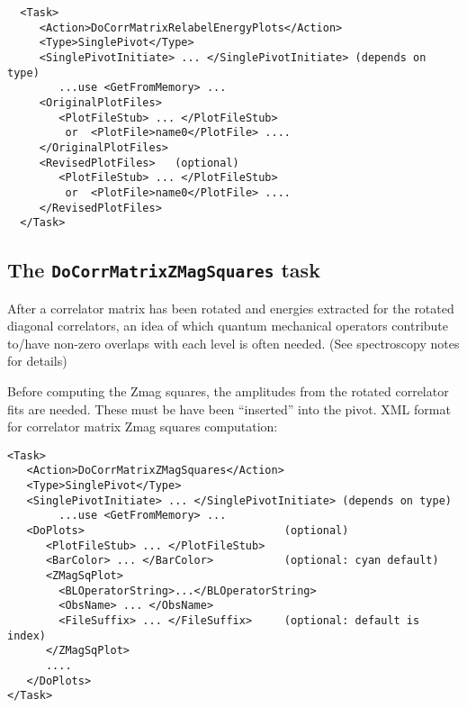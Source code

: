\documentclass[12pt]{article}
\newcommand{\vb}{\texttt}
\begin{document}
\begin{verbatim}
  <Task>
     <Action>DoCorrMatrixRelabelEnergyPlots</Action>
     <Type>SinglePivot</Type>
     <SinglePivotInitiate> ... </SinglePivotInitiate> (depends on type)
        ...use <GetFromMemory> ...
     <OriginalPlotFiles>
        <PlotFileStub> ... </PlotFileStub>
         or  <PlotFile>name0</PlotFile> ....
     </OriginalPlotFiles>
     <RevisedPlotFiles>   (optional)
        <PlotFileStub> ... </PlotFileStub>
         or  <PlotFile>name0</PlotFile> ....
     </RevisedPlotFiles>
  </Task>
\end{verbatim}

\subsection{The \vb{DoCorrMatrixZMagSquares} task}
After a correlator matrix has been rotated and energies extracted for the rotated diagonal correlators,
an idea of which quantum mechanical operators contribute to/have non-zero overlaps with each level is
often needed. (See spectroscopy notes for details)

Before computing the Zmag squares, the amplitudes from the rotated correlator fits are needed.
These must be have been ``inserted'' into the pivot. XML format for correlator matrix Zmag squares computation:

\begin{verbatim}
<Task>
   <Action>DoCorrMatrixZMagSquares</Action>
   <Type>SinglePivot</Type>
   <SinglePivotInitiate> ... </SinglePivotInitiate> (depends on type)
        ...use <GetFromMemory> ...
   <DoPlots>                               (optional)
      <PlotFileStub> ... </PlotFileStub>
      <BarColor> ... </BarColor>           (optional: cyan default)
      <ZMagSqPlot>
        <BLOperatorString>...</BLOperatorString>
        <ObsName> ... </ObsName>
        <FileSuffix> ... </FileSuffix>     (optional: default is index)
      </ZMagSqPlot>
      ....
   </DoPlots>
</Task>
\end{verbatim}
\end{document}
